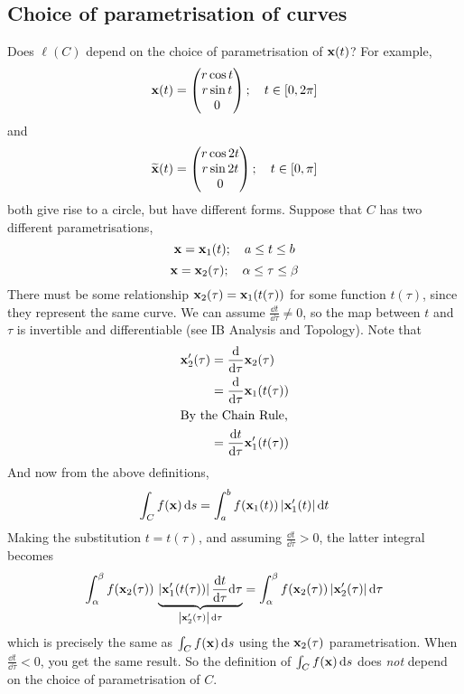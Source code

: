\subsection{Choice of parametrisation of curves}
Does \(\ell(C)\) depend on the choice of parametrisation of \(\vb x(t)\)?
For example,
\[
	\vb x(t) = \begin{pmatrix}
		r\cos t \\ r \sin t \\ 0
	\end{pmatrix};\quad t \in [0, 2\pi]
\]
and
\[
	\widetilde{\vb x}(t) = \begin{pmatrix}
		r\cos 2t \\ r \sin 2t \\ 0
	\end{pmatrix};\quad t \in [0, \pi]
\]
both give rise to a circle, but have different forms.
Suppose that \(C\) has two different parametrisations,
\[
	\vb x = \vb x_1(t);\quad a \leq t \leq b
\]
\[
	\vb x = \vb x_2(\tau);\quad \alpha \leq \tau \leq \beta
\]
There must be some relationship \(\vb x_2(\tau) = \vb x_1(t(\tau))\) for some function \(t(\tau)\), since they represent the same curve.
We can assume \(\frac{\dd{t}}{\dd \tau} \neq 0\), so the map between \(t\) and \(\tau\) is invertible and differentiable (see IB Analysis and Topology).
Note that
\begin{align*}
	\vb x_2'(\tau) & = \frac{\dd}{\dd \tau}\vb x_2(\tau)        \\
	               & = \frac{\dd}{\dd \tau}\vb x_1(t(\tau))     \\
	\intertext{By the Chain Rule,}
	               & = \frac{\dd{t}}{\dd \tau}\vb x_1'(t(\tau))
\end{align*}
And now from the above definitions,
\[
	\int_C f(\vb x) \dd{s} = \int_a^b f(\vb x_1(t)) \, \abs{\vb x_1'(t)} \dd{t}
\]
Making the substitution \(t = t(\tau)\), and assuming \(\frac{\dd{t}}{\dd \tau} > 0\), the latter integral becomes
\[
	\int_\alpha^\beta f(\vb x_2(\tau)) \, \underbrace{\abs{\vb x_1'(t(\tau))} \,\frac{\dd{t}}{\dd \tau}\dd \tau}_{\abs{\vb x_2'(\tau)}\,\dd \tau} = \int_\alpha^\beta f(\vb x_2(\tau)) \, \abs{\vb x_2'(\tau)} \,\dd \tau
\]
which is precisely the same as \(\int_C f(\vb x) \dd{s}\) using the \(\vb x_2(\tau)\) parametrisation.
When \(\frac{\dd{t}}{\dd \tau} < 0\), you get the same result.
So the definition of \(\int_C f(\vb x) \dd{s}\) does \textit{not} depend on the choice of parametrisation of \(C\).

